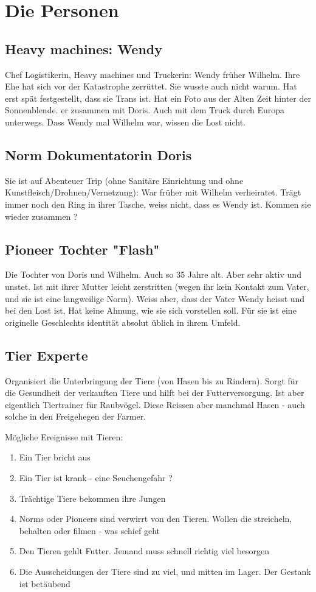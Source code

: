 \documentclass{book}
\begin{document}
\chapter{Die Personen}

\section{Heavy machines: Wendy}

Chef Logistikerin, Heavy machines und Truckerin: Wendy früher Wilhelm. Ihre Ehe hat sich vor der Katastrophe zerrüttet. Sie wusste auch nicht warum. Hat erst spät festgestellt, dass sie Trans ist. Hat ein Foto aus der Alten Zeit hinter der Sonnenblende. er zusammen mit Doris. Auch mit dem Truck durch Europa unterwegs. Dass Wendy mal Wilhelm war, wissen die Lost nicht.

\section{Norm Dokumentatorin Doris}
Sie ist auf Abenteuer Trip (ohne Sanitäre Einrichtung und ohne Kunstfleisch/Drohnen/Vernetzung): War früher mit Wilhelm verheiratet. Trägt immer noch den Ring in ihrer Tasche, weiss nicht, dass es Wendy ist. Kommen sie wieder zusammen ?

\section{Pioneer Tochter "Flash"}
Die Tochter von Doris und Wilhelm. Auch so 35 Jahre alt. Aber sehr aktiv und unstet. Ist mit ihrer Mutter leicht zerstritten (wegen ihr kein Kontakt zum Vater, und sie ist eine langweilige Norm). Weiss aber, dass der Vater Wendy heisst und bei den Lost ist, Hat keine Ahnung, wie sie sich vorstellen soll. Für sie ist eine originelle Geschlechts identität absolut üblich in ihrem Umfeld.

\section{Tier Experte}

Organisiert die Unterbringung der Tiere (von Hasen bis zu Rindern). Sorgt für die Gesundheit der verkauften Tiere und hilft bei der Futterversorgung. Ist aber eigentlich Tiertrainer für Raubvögel. Diese Reissen aber manchmal Hasen - auch solche in den Freigehegen der Farmer.

Mögliche Ereignisse mit Tieren:

\begin{enumerate}
\item Ein Tier bricht aus
\item Ein Tier ist krank - eine Seuchengefahr ?
\item Trächtige Tiere bekommen ihre Jungen
\item Norms oder Pioneers sind verwirrt von den Tieren. Wollen die streicheln, behalten oder filmen - was schief geht
\item Den Tieren gehlt Futter. Jemand muss schnell richtig viel besorgen
\item Die Ausscheidungen der Tiere sind zu viel, und mitten im Lager. Der Gestank ist betäubend
\end{enumerate}
\end{document}
